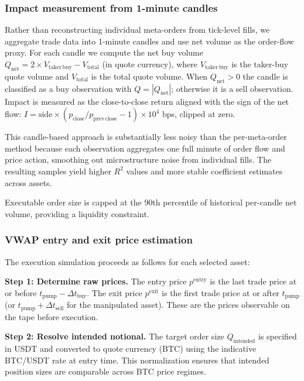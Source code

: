 \documentclass{ieeeaccess}
\begin{document}
\subsubsection{Impact measurement from 1-minute candles}
Rather than reconstructing individual meta-orders from tick-level fills, we aggregate trade data into 1-minute candles and use net volume as the order-flow proxy. For each candle we compute the net buy volume $Q_{\mathrm{net}} = 2 \times V_{\mathrm{taker\,buy}} - V_{\mathrm{total}}$ (in quote currency), where $V_{\mathrm{taker\,buy}}$ is the taker-buy quote volume and $V_{\mathrm{total}}$ is the total quote volume. When $Q_{\mathrm{net}} > 0$ the candle is classified as a buy observation with $Q = |Q_{\mathrm{net}}|$; otherwise it is a sell observation. Impact is measured as the close-to-close return aligned with the sign of the net flow: $I = \mathrm{side} \times (p_{\mathrm{close}} / p_{\mathrm{prev\,close}} - 1) \times 10^4$ bps, clipped at zero.

This candle-based approach is substantially less noisy than the per-meta-order method because each observation aggregates one full minute of order flow and price action, smoothing out microstructure noise from individual fills. The resulting samples yield higher $R^2$ values and more stable coefficient estimates across assets.

Executable order size is capped at the 90th percentile of historical per-candle net volume, providing a liquidity constraint.

\subsubsection{VWAP entry and exit price estimation}
\label{sec:vwap_estimation}

The execution simulation proceeds as follows for each selected asset:

\textbf{Step 1: Determine raw prices.} The entry price $p^{\mathrm{entry}}$ is the last trade price at or before $t_{\mathrm{pump}} - \Delta t_{\mathrm{buy}}$. The exit price $p^{\mathrm{exit}}$ is the first trade price at or after $t_{\mathrm{pump}}$ (or $t_{\mathrm{pump}} + \Delta t_{\mathrm{sell}}$ for the manipulated asset). These are the prices observable on the tape before execution.

\textbf{Step 2: Resolve intended notional.} The target order size $Q_{\mathrm{intended}}$ is specified in USDT and converted to quote currency (BTC) using the indicative BTC/USDT rate at entry time. This normalization ensures that intended position sizes are comparable across BTC price regimes.
\end{document}
